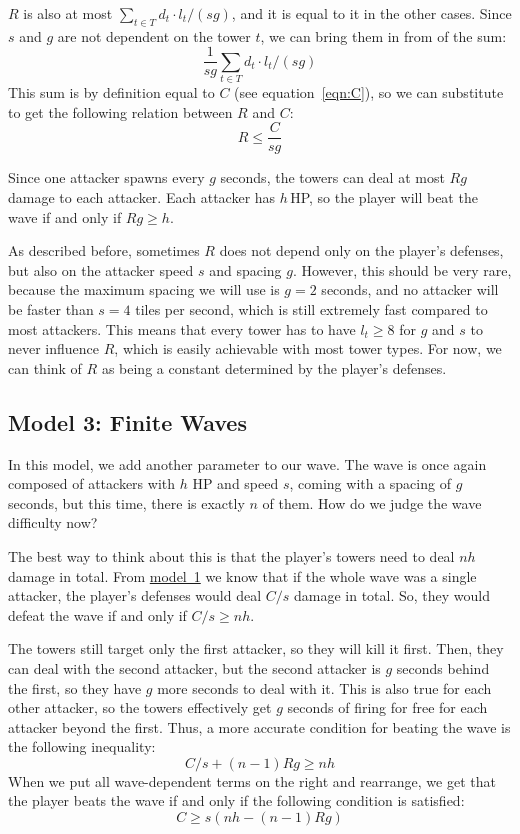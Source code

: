 $R$ is also at most $\sum_{t \in T} d_t \cdot l_t / (s g)$, and it is equal to it in the other cases.
Since $s$ and $g$ are not dependent on the tower $t$, we can bring them in from of the sum:
\begin{equation}
    \frac{1}{s g} \sum_{t \in T} d_t \cdot l_t / (s g)
\end{equation}
This sum is by definition equal to $C$ (see equation~\ref{eqn:C}), so we can substitute to get the following relation between $R$ and $C$:
\begin{equation}\label{eqn:RC}
    R \leq \frac{C}{s g}
\end{equation}

Since one attacker spawns every $g$ seconds, the towers can deal at most $Rg$ damage to each attacker.
Each attacker has $h$\,HP, so the player will beat the wave if and only if $Rg \geq h$.

As described before, sometimes $R$ does not depend only on the player's defenses, but also on the attacker speed $s$ and spacing $g$.
However, this should be very rare, because the maximum spacing we will use is $g=2$ seconds, and no attacker will be faster than $s=4$ tiles per second, which is still extremely fast compared to most attackers.
This means that every tower has to have $l_t \geq 8$ for $g$ and $s$ to never influence $R$, which is easily achievable with most tower types.
For now, we can think of $R$ as being a constant determined by the player's defenses.

\subsection{Model 3: Finite Waves}\label{sec:analysis-waves-finite}
In this model, we add another parameter to our wave.
The wave is once again composed of attackers with $h$ HP and speed $s$, coming with a spacing of $g$ seconds, but this time, there is exactly $n$ of them.
How do we judge the wave difficulty now?

The best way to think about this is that the player's towers need to deal $nh$ damage in total.
From \hyperref[sec:analysis-waves-single]{model~1} we know that if the whole wave was a single attacker, the player's defenses would deal $C/s$ damage in total.
So, they would defeat the wave if and only if $C/s \geq nh$.

The towers still target only the first attacker, so they will kill it first.
Then, they can deal with the second attacker, but the second attacker is $g$ seconds behind the first, so they have $g$ more seconds to deal with it.
This is also true for each other attacker, so the towers effectively get $g$ seconds of firing for free for each attacker beyond the first.
Thus, a more accurate condition for beating the wave is the following inequality:
\begin{equation}
    C/s + (n-1) R g \geq nh
\end{equation}
When we put all wave-dependent terms on the right and rearrange, we get that the player beats the wave if and only if the following condition is satisfied:
\begin{equation}\label{eqn:beat-finite-wave}
    C \geq s(nh - (n - 1)Rg)
\end{equation}


